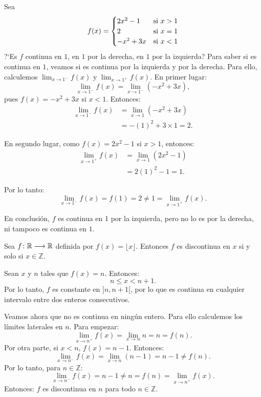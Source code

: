 \begin{exemplo}[Solución]{%
Sea
\begin{equation*}
f(x) =
\begin{cases}
2x^2-1& $si $x>1$$\\
2& $si $x=1$$\\
-x^2+3x& $si $x<1$$
\end{cases}
\end{equation*}
?`Es $f$ continua en $1$, en $1$ por la derecha, en $1$ por la izquierda?}%
Para saber si es continua en
$1$, veamos si es continua por la izquierda y por la derecha. Para ello, calculemos $\displaystyle\lim_{x\to
1^-}f(x)$ y $\displaystyle\lim_{x\to 1^+}f(x)$. En primer lugar:
\[
\lim_{x\to 1^-}f(x)  = \lim_{x\to 1^-}(-x^2+3x),
\]
pues $f(x)=-x^2+3x$ si $x < 1$. Entonces:
\begin{align*}
\lim_{x\to 1^-}f(x) &= \lim_{x\to 1}(-x^2+3x) \\
&= -(1)^2 + 3\times 1 = 2.
\end{align*}

En segundo lugar, como $f(x) = 2x^2-1$ si $x > 1$, entonces:
\begin{align*}
\lim_{x\to 1^+}f(x) &= \lim_{x\to 1}(2x^2-1) \\
&= 2(1)^2 - 1 = 1.
\end{align*}

Por lo tanto:
\[
\lim_{x\to 1^-}f(x)  = f(1) = 2\neq 1 =\lim_{x\to 1^+}f(x) .
\]

En conclusión, $f$ es continua en 1 por la izquierda, pero no lo es por la derecha, ni tampoco es
continua en $1$.
\end{exemplo}

\begin{exemplo}[Solución]{%
Sea $f\colon \mathbb{R}\longrightarrow \mathbb{R}$ definida por $f(x) = \lfloor x \rfloor$. Entonces $f$ es
discontinua en $x$ si y solo si $x\in \mathbb{Z}$.}

Sean $x$ y $n$ tales que $f(x) = n$. Entonces:
\[
n \leq x < n +1.
\]
Por lo tanto, $f$ es constante en $]n,n+1[$, por lo que es continua en cualquier intervalo entre
dos enteros consecutivos.

Veamos ahora que no es continua en ningún entero. Para ello calculemos los límites laterales en
$n$. Para empezar:
\[
\lim_{x\to n^+}f(x) = \lim_{x\to n}n = n = f(n).
\]
Por otra parte, si $x < n$, $f(x) = n - 1$. Entonces:
\[
\lim_{x\to n^-}f(x) = \lim_{x\to n}(n-1) = n-1 \neq f(n).
\]
Por lo tanto, para $n\in \mathbb{Z}$:
\[
\lim_{x\to n^-}f(x) = n-1\neq n= f(n) = \lim_{x\to n^+}f(x).
\]
Entonces: $f$ es discontinua en $n$ para todo $n\in \mathbb{Z}$.
\end{exemplo}

